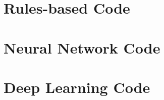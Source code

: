 \chapter{Rules-based Code}
\label{chapter:rules-code}



\chapter{Neural Network Code}
\label{chapter:neural-network-code}



\chapter{Deep Learning Code}
\label{chapter:deep-learning-code}



